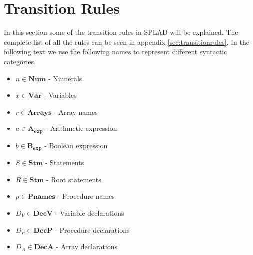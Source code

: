 

\section{Transition Rules}
In this section some of the transition rules in SPLAD will be explained. The complete list of all the rules can be seen in appendix \ref{sec:transitionrules}.
In the following text we use the following names to represent different syntactic categories.
\begin{itemize}
\item $n \in \textbf{Num}$ - Numerals
\item $x \in \textbf{Var}$ - Variables 
\item $r \in \textbf{Arrays}$ - Array names
\item $a \in \mathbf{A_{exp}}$ - Arithmetic expression
\item $b \in \mathbf{B_{exp}}$ - Boolean expression
\item $S \in \textbf{Stm}$ - Statements
\item $R \in \textbf{Stm}$ - Root statements
\item $p \in \textbf{Pnames}$ - Procedure names
\item $D_V \in \textbf{DecV}$ - Variable declarations
\item $D_P \in \textbf{DecP}$ - Procedure declarations
\item $D_A \in \textbf{DecA}$ - Array declarations
\end{itemize}


